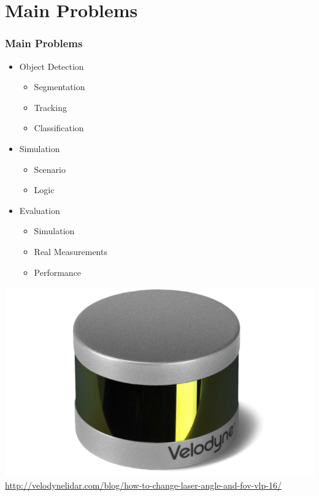 \documentclass[nosymbols]{beamer}	%
\begin{document}
\section{Main Problems}
\begin{frame}
  \frametitle{Main Problems}
  \begin{minipage}[t]{0.49\textwidth}
  \vspace{0pt}
  \begin{itemize}
	  \item Object Detection
	  \begin{itemize}
		  \item Segmentation
		  \item Tracking
		  \item Classification
	  \end{itemize}
	  \item Simulation
	  \begin{itemize}
		  \item Scenario
		  \item Logic
	  \end{itemize}
	  \item Evaluation
	  \begin{itemize}
		  \item Simulation
		  \item Real Measurements
		  \item Performance
	  \end{itemize}
  \end{itemize}
  \end{minipage}%
  \hfill
  \begin{minipage}[t]{0.49\textwidth}
  \vspace{0pt}
      \centering
      \includegraphics[width=\textwidth]{bilder/puck-1-750x460.png}\\
      \tiny{\url{http://velodynelidar.com/blog/how-to-change-laser-angle-and-fov-vlp-16/}}
  \end{minipage}	
\end{frame}
\end{document}
